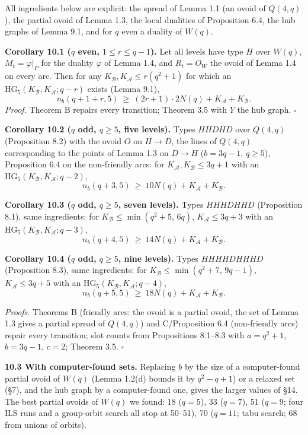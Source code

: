 \documentclass[
  11pt,
]{article}
\begin{document}
All ingredients below are explicit: the spread of Lemma 1.1 (an ovoid of
\(Q(4,q)\)), the partial ovoid of Lemma 1.3, the local dualities of
Proposition 6.4, the hub graphs of Lemma 9.1, and for \(q\) even a
duality of \(W(q)\).

\textbf{Corollary 10.1 (\(q\) even, \(1\le r\le q-1\)).} Let all levels
have type \(H\) over \(W(q)\), \(M_t = \varphi|_P\) for the duality
\(\varphi\) of Lemma 1.4, and \(R_t = O_W\) the ovoid of Lemma 1.4 on
every arc. Then for any \(K_{\mathcal B},K_{\mathcal A}\le r(q^2+1)\)
for which an \(\mathrm{HG}_5(K_{\mathcal B},K_{\mathcal A};q-r)\) exists
(Lemma 9.1),
\[n_b(q+1+r,5)\ \ge\ (2r+1)\cdot 2N(q)+K_{\mathcal A}+K_{\mathcal B}.\]
\emph{Proof.} Theorem B repairs every transition; Theorem 3.5 with \(Y\)
the hub graph. \(\square\)

\textbf{Corollary 10.2 (\(q\) odd, \(q\ge 5\), five levels).} Types
\(HHDHD\) over \(Q(4,q)\) (Proposition 8.2) with the ovoid \(O\) on
\(H\to D\), the lines of \(Q(4,q)\) corresponding to the points of Lemma
1.3 on \(D\to H\) (\(b = 3q-1\), \(q\ge 5\)), Proposition 6.4 on the
non-friendly arcs: for \(K_{\mathcal A},K_{\mathcal B}\le 3q+1\) with an
\(\mathrm{HG}_5(K_{\mathcal B}, K_{\mathcal A};q-2)\),
\[n_b(q+3,5)\ \ge\ 10N(q)+K_{\mathcal A}+K_{\mathcal B}.\]

\textbf{Corollary 10.3 (\(q\) odd, \(q\ge 5\), seven levels).} Types
\(HHHDHHD\) (Proposition 8.1), same ingredients: for
\(K_{\mathcal B}\le\min(q^2+5,\,6q)\), \(K_{\mathcal A}\le 3q+3\) with
an \(\mathrm{HG}_5(K_{\mathcal B},K_{\mathcal A};q-3)\),
\[n_b(q+4,5)\ \ge\ 14N(q)+K_{\mathcal A}+K_{\mathcal B}.\]

\textbf{Corollary 10.4 (\(q\) odd, \(q\ge 5\), nine levels).} Types
\(HHHHDHHHD\) (Proposition 8.3), same ingredients: for
\(K_{\mathcal B}\le\min(q^2+7,\,9q-1)\), \(K_{\mathcal A}\le 3q+5\) with
an \(\mathrm{HG}_5(K_{\mathcal B},K_{\mathcal A};q-4)\),
\[n_b(q+5,5)\ \ge\ 18N(q)+K_{\mathcal A}+K_{\mathcal B}.\]

\emph{Proofs.} Theorems B (friendly arcs: the ovoid is a partial ovoid,
the set of Lemma 1.3 gives a partial spread of \(Q(4,q)\)) and
C/Proposition 6.4 (non-friendly arcs) repair every transition; slot
counts from Propositions 8.1--8.3 with \(a = q^2+1\), \(b = 3q-1\),
\(c = 2\); Theorem 3.5. \(\square\)

\textbf{10.3 With computer-found sets.} Replacing \(b\) by the size of a
computer-found partial ovoid of \(W(q)\) (Lemma 1.2(d) bounds it by
\(q^2-q+1\)) or a relaxed set (§7), and the hub graph by a
computer-found one, gives the larger values of §14. The best partial
ovoids of \(W(q)\) we found: 18 (\(q=5\)), 33 (\(q=7\)), 51 (\(q=9\);
four ILS runs and a group-orbit search all stop at 50--51), 70
(\(q=11\); tabu search; 68 from unions of orbits).
\end{document}
